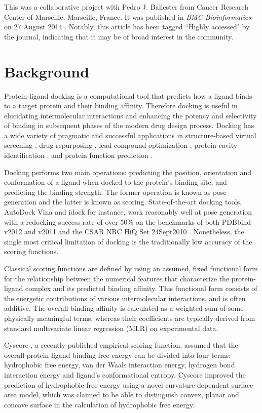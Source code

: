 This was a collaborative project with Pedro J. Ballester from Cancer Research Center of Marseille, Marseille, France. It was published in \textit{BMC Bioinformatics} on 27 August 2014 \citep{1432}. Notably, this article has been tagged ``Highly accessed" by the journal, indicating that it may be of broad interest in the community.

\section{Background}

Protein-ligand docking is a computational tool that predicts how a ligand binds to a target protein and their binding affinity. Therefore docking is useful in elucidating intermolecular interactions and enhancing the potency and selectivity of binding in subsequent phases of the modern drug design process. Docking has a wide variety of pragmatic and successful applications in structure-based virtual screening \citep{1383}, drug repurposing \citep{1384}, lead compound optimization \citep{1385}, protein cavity identification \citep{1217}, and protein function prediction \citep{1386}.

Docking performs two main operations: predicting the position, orientation and conformation of a ligand when docked to the protein's binding site, and predicting the binding strength. The former operation is known as pose generation and the latter is known as scoring. State-of-the-art docking tools, AutoDock Vina \citep{595} and idock \citep{1153} for instance, work reasonably well at pose generation with a redocking success rate of over 50\% \citep{1362} on the benchmarks of both PDBbind v2012 and v2011 \citep{529,530,1633} and the CSAR NRC HiQ Set 24Sept2010 \citep{857,960}. Nonetheless, the single most critical limitation of docking is the traditionally low accuracy of the scoring functions.

Classical scoring functions are defined by using an assumed, fixed functional form for the relationship between the numerical features that characterize the protein-ligand complex and its predicted binding affinity. This functional form consists of the energetic contributions of various intermolecular interactions, and is often additive. The overall binding affinity is calculated as a weighted sum of some physically meaningful terms, whereas their coefficients are typically derived from standard multivariate linear regression (MLR) on experimental data.

Cyscore \citep{1372}, a recently published empirical scoring function, assumed that the overall protein-ligand binding free energy can be divided into four terms: hydrophobic free energy, van der Waals interaction energy, hydrogen bond interaction energy and ligand's conformational entropy. Cyscore improved the prediction of hydrophobic free energy using a novel curvature-dependent surface-area model, which was claimed to be able to distinguish convex, planar and concave surface in the calculation of hydrophobic free energy.


